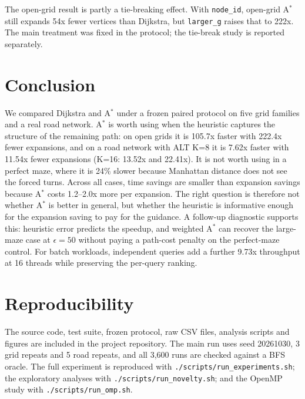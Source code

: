 \documentclass[conference,10pt]{IEEEtran}
\newcommand{\Astar}{A$^\ast$}
\newcommand{\code}[1]{\texttt{#1}}
\begin{document}
The open-grid result is partly a tie-breaking effect.  With \code{node\_id},
open-grid \Astar{} still expands 54x fewer vertices than Dijkstra, but
\code{larger\_g} raises that to 222x.  The main treatment was fixed in the
protocol; the tie-break study is reported separately.

\section{Conclusion}
\label{sec:conclusion}

We compared Dijkstra and \Astar{} under a frozen paired protocol on five grid
families and a real road network.  \Astar{} is worth using when the heuristic
captures the structure of the remaining path: on open grids it is 105.7x faster
with 222.4x fewer expansions, and on a road network with ALT K=8 it is 7.62x
faster with 11.54x fewer expansions (K=16: 13.52x and 22.41x).  It is not worth
using in a perfect maze, where it is 24\% slower because Manhattan distance does
not see the forced turns.  Across all cases, time savings are smaller than
expansion savings because \Astar{} costs 1.2--2.0x more per expansion.  The right question is therefore not whether \Astar{} is better in general, but
whether the heuristic is informative enough for the expansion saving to pay for
the guidance.  A follow-up diagnostic supports this: heuristic error predicts
the speedup, and weighted \Astar{} can recover the large-maze case at
$\epsilon=50$ without paying a path-cost penalty on the perfect-maze control.
For batch workloads, independent queries add a further 9.73x throughput at 16
threads while preserving the per-query ranking.

\section*{Reproducibility}
The source code, test suite, frozen protocol, raw CSV files, analysis scripts
and figures are included in the project repository.  The main run uses seed
20261030, 3 grid repeats and 5 road repeats, and all 3,600 runs are checked
against a BFS oracle.  The full experiment is reproduced with
\code{./scripts/run\_experiments.sh}; the exploratory analyses with
\code{./scripts/run\_novelty.sh}; and the OpenMP study with
\code{./scripts/run\_omp.sh}.
\end{document}
